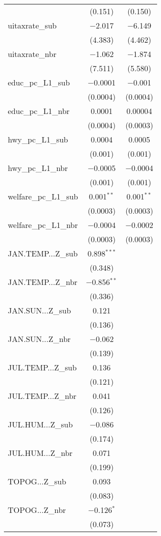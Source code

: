 \begin{table}[!htbp]
\begin{tabular}{@{\extracolsep{5pt}}lcc}
  & (0.151) & (0.150) \\ 
  uitaxrate\_sub & $-$2.017 & $-$6.149 \\ 
  & (4.383) & (4.462) \\ 
  uitaxrate\_nbr & $-$1.062 & $-$1.874 \\ 
  & (7.511) & (5.580) \\ 
  educ\_pc\_L1\_sub & $-$0.0001 & $-$0.001 \\ 
  & (0.0004) & (0.0004) \\ 
  educ\_pc\_L1\_nbr & 0.0001 & 0.00004 \\ 
  & (0.0004) & (0.0003) \\ 
  hwy\_pc\_L1\_sub & 0.0004 & 0.0005 \\ 
  & (0.001) & (0.001) \\ 
  hwy\_pc\_L1\_nbr & $-$0.0005 & $-$0.0004 \\ 
  & (0.001) & (0.001) \\ 
  welfare\_pc\_L1\_sub & 0.001$^{**}$ & 0.001$^{**}$ \\ 
  & (0.0003) & (0.0003) \\ 
  welfare\_pc\_L1\_nbr & $-$0.0004 & $-$0.0002 \\ 
  & (0.0003) & (0.0003) \\ 
  JAN.TEMP...Z\_sub & 0.898$^{***}$ &  \\ 
  & (0.348) &  \\ 
  JAN.TEMP...Z\_nbr & $-$0.856$^{**}$ &  \\ 
  & (0.336) &  \\ 
  JAN.SUN...Z\_sub & 0.121 &  \\ 
  & (0.136) &  \\ 
  JAN.SUN...Z\_nbr & $-$0.062 &  \\ 
  & (0.139) &  \\ 
  JUL.TEMP...Z\_sub & 0.136 &  \\ 
  & (0.121) &  \\ 
  JUL.TEMP...Z\_nbr & 0.041 &  \\ 
  & (0.126) &  \\ 
  JUL.HUM...Z\_sub & $-$0.086 &  \\ 
  & (0.174) &  \\ 
  JUL.HUM...Z\_nbr & 0.071 &  \\ 
  & (0.199) &  \\ 
  TOPOG...Z\_sub & 0.093 &  \\ 
  & (0.083) &  \\ 
  TOPOG...Z\_nbr & $-$0.126$^{*}$ &  \\ 
  & (0.073) &  \\ 

\end{tabular}
\end{table}

